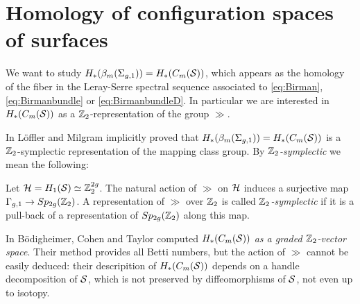 \section{Homology of configuration spaces of surfaces}
\label{sec:HBraidSurf}
We want to study $H_*(\bms)=H_*(\cms)$,
which appears as the homology of the fiber
in the Leray-Serre spectral sequence associated to
\eqref{eq:Birman}, \eqref{eq:Birmanbundle} or \eqref{eq:BirmanbundleD}.
In particular we are interested in $H_*(C_m(\S))$
as a $\Z_2$-representation of the group $\gg$.

In \cite{LM} L\"offler and Milgram implicitly proved that $H_*(\bms)=H_*(\cms)$ is a $\Z_2$-symplectic
representation of the mapping class group. By \emph{$\Z_2$-symplectic} we mean the following:
\begin{defn}
 \label{defn:symplrep}
 Let $\H=H_1(\S)\simeq\Z_2^{2g}$.
 The natural action of $\gg$ on $\H$ induces a surjective map
 $\gg\to Sp_{2g}(\Z_2)$. A representation of $\gg$ over $\Z_2$ is called \emph{$\Z_2$-symplectic}
 if it is a pull-back of a representation of $Sp_{2g}(\Z_2)$ along this map.
\end{defn}

In \cite{BCT} B\"odigheimer, Cohen and Taylor computed $H_*(\cms)$ \emph{as a graded $\Z_2$-vector space}.
Their method provides all Betti numbers, but the action of $\gg$ cannot be easily deduced:
their descripition of $H_*(\cms)$ depends on a handle decomposition of $\S$, which is not preserved
by diffeomorphisms of $\S$, not even up to isotopy.

